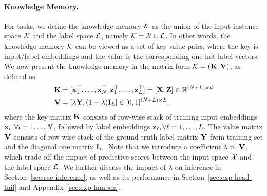 \paragraph{Knowledge Memory.}
For \XMC tasks, we define the knowledge memory ${\mathcal{K}}$ as the union of the input instance space ${\mathcal{X}}$ and the label space ${\mathcal{L}}$, namely ${\mathcal{K}} = {\mathcal{X}} \cup {\mathcal{L}}$.
In other words, the knowledge memory ${\mathcal{K}}$ can be viewed as a set of key value pairs, where the key is input/label embeddings and the value is the corresponding one-hot label vectors.
We now present the knowledge memory in the matrix form ${\mathcal{K}} = ({\mathbf{K}}, {\mathbf{V}})$, as defined as
\begin{align}
    {\mathbf{K}} &= [{\mathbf{x}}_1^\top, \ldots, {\mathbf{x}}_{N}^{\top}, {\mathbf{z}}_1^{\top}, \ldots, {\mathbf{z}}_L^{\top} ]
    = [{\mathbf{X}}, {\mathbf{Z}} ] \in {\mathbb{R}}^{ (N + L) \times d} \label{eq:rae-key-mat} \\
    {\mathbf{V}} &= [\lambda {\mathbf{Y}}, (1-\lambda) {\mathbf{I}}_L] \in [0, 1]^{ (N + L) \times L}, \label{eq:rae-val-mat}
\end{align}
where the key matrix ${\mathbf{K}}$ consists of row-wise stack of training input embeddings ${\mathbf{x}}_i, \forall i=1,\ldots N$,
followed by label embeddings ${\mathbf{z}}_\ell, \forall \ell=1,\ldots,L$.
The value matrix ${\mathbf{V}}$ consists of row-wise stack of the ground truth label matrix ${\mathbf{Y}}$ from training set and the diagonal one matrix ${\mathbf{I}}_L$.
Note that we introduce a coefficient $\lambda$ in ${\mathbf{V}}$, which trade-off the impact of predictive scores between the input space ${\mathcal{X}}$ and the label space ${\mathcal{L}}$.
We further discuss the impact of $\lambda$ on inference in Section~\ref{sec:rae-inference},
as well as its performance in Section~\ref{sec:exp-head-tail} and Appendix~\ref{sec:exp-lambda}.

